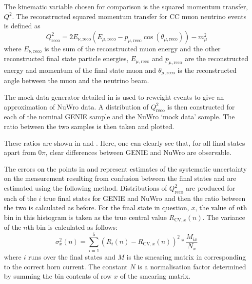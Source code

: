 The kinematic variable chosen for comparison is the squared momentum transfer, $Q^{2}$.
The reconstructed squared momentum transfer for CC muon neutrino events is defined as
\begin{equation}
Q^{2}_{\textrm{reco}} = 2E_{\nu, \textrm{reco}} \left( E_{\mu, \textrm{reco}} - p_{\mu, \textrm{reco}} \cos \left( \theta_{\mu, \textrm{reco}} \right) \right) - m_{\mu}^{2}
\end{equation}
where $E_{\nu, \textrm{reco}}$ is the sum of the reconstructed muon energy and the other reconstructed final state particle energies, $E_{\mu, \textrm{reco}}$ and $p_{\mu, \textrm{reco}}$ are the reconstructed energy and momentum of the final state muon and $\theta_{\mu, \textrm{reco}}$ is the reconstructed angle between the muon and the neutrino beam.

The mock data generator detailed in  is used to reweight events to give an approximation of NuWro data.
A distribution of $Q^{2}_{\textrm{reco}}$ is then constructed for each of the nominal GENIE sample and the NuWro `mock data' sample. 
The ratio between the two samples is then taken and plotted. 

These ratios are shown in  and . 
Here, one can clearly see that, for all final states apart from $0\pi$, clear differences between GENIE and NuWro are observable.

The errors on the points in  and  represent estimates of the systematic uncertainty on the measurement resulting from confusion between the final states and are estimated using the following method.
Distributions of $Q^{2}_{\textrm{reco}}$ are produced for each of the $i$ true final states for GENIE and NuWro and then the ratio between the two is calculated as before.
For the final state in question, $x$, the value of $n$th bin in this histogram is taken as the true central value $R_{\textrm{CV}, x}(n)$.
The variance of the $n$th bin is calculated as follows:
\begin{equation}
	\sigma_{x}^{2}(n) = \sum_{i=1}^{5} \left( R_{i}(n) - R_{\textrm{CV}, x}(n) \right)^{2} * \frac{M_{i x}}{N_{x}}
\end{equation}
where $i$ runs over the final states and $M$ is the smearing matrix in  corresponding to the correct horn current.
The constant $N$ is a normalisation factor determined by summing the bin contents of row $x$ of the smearing matrix. 

